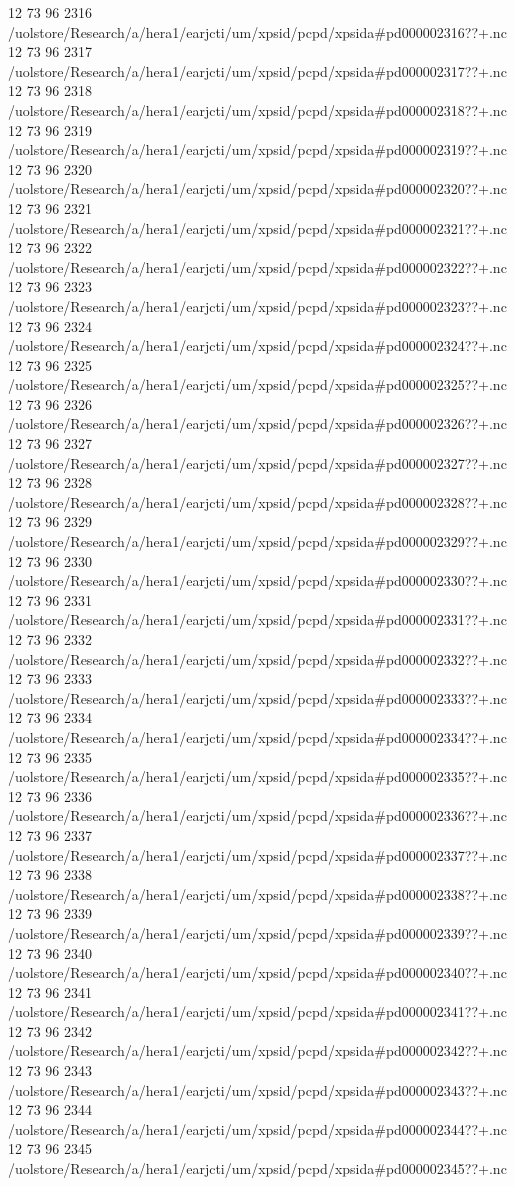 12 73 96
2316
/uolstore/Research/a/hera1/earjcti/um/xpsid/pcpd/xpsida#pd000002316??+.nc
12 73 96
2317
/uolstore/Research/a/hera1/earjcti/um/xpsid/pcpd/xpsida#pd000002317??+.nc
12 73 96
2318
/uolstore/Research/a/hera1/earjcti/um/xpsid/pcpd/xpsida#pd000002318??+.nc
12 73 96
2319
/uolstore/Research/a/hera1/earjcti/um/xpsid/pcpd/xpsida#pd000002319??+.nc
12 73 96
2320
/uolstore/Research/a/hera1/earjcti/um/xpsid/pcpd/xpsida#pd000002320??+.nc
12 73 96
2321
/uolstore/Research/a/hera1/earjcti/um/xpsid/pcpd/xpsida#pd000002321??+.nc
12 73 96
2322
/uolstore/Research/a/hera1/earjcti/um/xpsid/pcpd/xpsida#pd000002322??+.nc
12 73 96
2323
/uolstore/Research/a/hera1/earjcti/um/xpsid/pcpd/xpsida#pd000002323??+.nc
12 73 96
2324
/uolstore/Research/a/hera1/earjcti/um/xpsid/pcpd/xpsida#pd000002324??+.nc
12 73 96
2325
/uolstore/Research/a/hera1/earjcti/um/xpsid/pcpd/xpsida#pd000002325??+.nc
12 73 96
2326
/uolstore/Research/a/hera1/earjcti/um/xpsid/pcpd/xpsida#pd000002326??+.nc
12 73 96
2327
/uolstore/Research/a/hera1/earjcti/um/xpsid/pcpd/xpsida#pd000002327??+.nc
12 73 96
2328
/uolstore/Research/a/hera1/earjcti/um/xpsid/pcpd/xpsida#pd000002328??+.nc
12 73 96
2329
/uolstore/Research/a/hera1/earjcti/um/xpsid/pcpd/xpsida#pd000002329??+.nc
12 73 96
2330
/uolstore/Research/a/hera1/earjcti/um/xpsid/pcpd/xpsida#pd000002330??+.nc
12 73 96
2331
/uolstore/Research/a/hera1/earjcti/um/xpsid/pcpd/xpsida#pd000002331??+.nc
12 73 96
2332
/uolstore/Research/a/hera1/earjcti/um/xpsid/pcpd/xpsida#pd000002332??+.nc
12 73 96
2333
/uolstore/Research/a/hera1/earjcti/um/xpsid/pcpd/xpsida#pd000002333??+.nc
12 73 96
2334
/uolstore/Research/a/hera1/earjcti/um/xpsid/pcpd/xpsida#pd000002334??+.nc
12 73 96
2335
/uolstore/Research/a/hera1/earjcti/um/xpsid/pcpd/xpsida#pd000002335??+.nc
12 73 96
2336
/uolstore/Research/a/hera1/earjcti/um/xpsid/pcpd/xpsida#pd000002336??+.nc
12 73 96
2337
/uolstore/Research/a/hera1/earjcti/um/xpsid/pcpd/xpsida#pd000002337??+.nc
12 73 96
2338
/uolstore/Research/a/hera1/earjcti/um/xpsid/pcpd/xpsida#pd000002338??+.nc
12 73 96
2339
/uolstore/Research/a/hera1/earjcti/um/xpsid/pcpd/xpsida#pd000002339??+.nc
12 73 96
2340
/uolstore/Research/a/hera1/earjcti/um/xpsid/pcpd/xpsida#pd000002340??+.nc
12 73 96
2341
/uolstore/Research/a/hera1/earjcti/um/xpsid/pcpd/xpsida#pd000002341??+.nc
12 73 96
2342
/uolstore/Research/a/hera1/earjcti/um/xpsid/pcpd/xpsida#pd000002342??+.nc
12 73 96
2343
/uolstore/Research/a/hera1/earjcti/um/xpsid/pcpd/xpsida#pd000002343??+.nc
12 73 96
2344
/uolstore/Research/a/hera1/earjcti/um/xpsid/pcpd/xpsida#pd000002344??+.nc
12 73 96
2345
/uolstore/Research/a/hera1/earjcti/um/xpsid/pcpd/xpsida#pd000002345??+.nc
